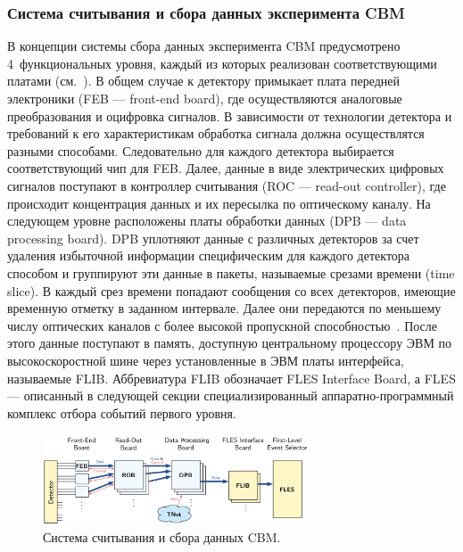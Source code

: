 \subsubsection{Система считывания и сбора данных эксперимента CBM}\label{sec:CBMreadout}

В концепции системы сбора данных эксперимента CBM предусмотрено 4~функциональных уровня, каждый из которых реализован соответствующими платами (см.~). В общем случае к детектору примыкает плата передней электроники (FEB --- front-end board), где осуществляются аналоговые преобразования и оцифровка сигналов.
В зависимости от технологии детектора и требований к его характеристикам обработка сигнала должна осуществлятся разными способами. Следовательно для каждого детектора выбирается соответствующий чип для FEB.
Далее, данные в виде электрических цифровых сигналов поступают в контроллер считывания (ROC --- read-out controller), где происходит концентрация данных и их пересылка по оптическому каналу. На следующем уровне расположены платы обработки данных (DPB --- data processing board). DPB уплотняют данные с различных детекторов за счет удаления избыточной информации специфическим для каждого детектора способом и группируют эти данные в пакеты, называемые срезами времени (time slice). В каждый срез времени попадают сообщения со всех детекторов, имеющие временную отметку в заданном интервале. Далее они передаются по меньшему числу оптических каналов с более высокой пропускной способностью~\cite{DPB}. После этого данные поступают в память, доступную центральному процессору ЭВМ по высокоскоростной шине через установленные в ЭВМ платы интерфейса, называемые FLIB. Аббревиатура FLIB обозначает FLES Interface Board, а FLES --- описанный в следующей секции специализированный аппаратно-программный комплекс отбора событий первого уровня.


\begin{figure}[H]
\centering
\includegraphics[width=0.7\textwidth]{pictures/CBMreadout.png}
\caption{Система считывания и сбора данных CBM.}
\label{fig:CBMreadout}
\end{figure}

